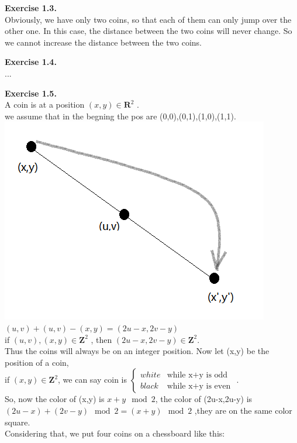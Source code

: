 \documentclass{article}
\begin{document}
\begin{flushleft}
\textbf{Exercise 1.3.} \\
Obviously, we have only two coins, so that each of them can only jump over the other one.
In this case, the distance between the two coins will never change. So we cannot increase the 
distance between the two coins.

\textbf{Exercise 1.4.} \\
...

\textbf{Exercise 1.5.} \\
A coin is at a position $(x,y)\in\mathbf{R}^2$ .\\
we assume that in the begning the pos are (0,0),(0,1),(1,0),(1,1).\\
\includegraphics[scale=1]{1_5_1.png}\\
$(u,v)+(u,v)-(x,y)=(2u-x,2v-y)$\\
if $(u,v),(x,y)\in\mathbf{Z}^2$ , then $(2u-x,2v-y)\in\mathbf{Z}^2$.\\
Thus the coins will always be on an integer position.
Now let (x,y) be the position of a coin,\\
if $(x,y)\in\mathbf{Z}^2$, we can say coin is
$
\left\{\begin{array}{ll}
white & \textrm{while x+y is odd}\\
black & \textrm{while x+y is even}
\end{array} \right.
$
.\\
So, now the color of (x,y) is $x+y\mod2$, the color of (2u-x,2u-y) is $(2u-x)+(2v-y)\mod2=(x+y)\mod2$
,they are on the same color square.\\
Considering that, we put four coins on a chessboard like this:

\end{flushleft}
\end{document}
